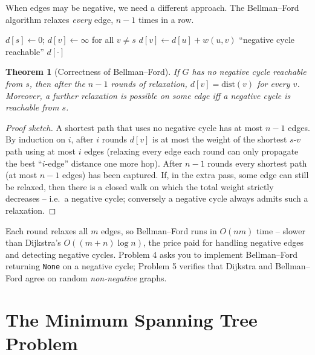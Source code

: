 \documentclass[11pt]{article}
\newtheorem{theorem}{Theorem}[section]
\begin{document}
When edges may be negative, we need a different approach. The Bellman--Ford
algorithm relaxes \emph{every} edge, $n-1$ times in a row.

\begin{algorithm}[h]
\caption{Bellman--Ford Single-Source Shortest Paths}
\begin{algorithmic}[1]
\State $d[s] \gets 0$; \quad $d[v] \gets \infty$ for all $v \ne s$
            \State $d[v] \gets d[u] + w(u,v)$ 
        \EndIf
    \EndFor
\EndFor
{} 
        \State \Return ``negative cycle reachable''
    \EndIf
\EndFor
\State \Return $d[\cdot]$
\end{algorithmic}
\end{algorithm}

\begin{theorem}[Correctness of Bellman--Ford]
If $G$ has no negative cycle reachable from $s$, then after the $n-1$ rounds of
relaxation, $d[v] = \mathrm{dist}(v)$ for every $v$. Moreover, a further
relaxation is possible on some edge \emph{iff} a negative cycle is reachable from
$s$.
\end{theorem}

\begin{proof}[Proof sketch]
A shortest path that uses no negative cycle has at most $n-1$ edges. By induction
on $i$, after $i$ rounds $d[v]$ is at most the weight of the shortest $s$-$v$
path using at most $i$ edges (relaxing every edge each round can only propagate
the best ``$i$-edge'' distance one more hop). After $n-1$ rounds every
shortest path (at most $n-1$ edges) has been captured. If, in the extra pass,
some edge can still be relaxed, then there is a closed walk on which the total
weight strictly decreases -- i.e.\ a negative cycle; conversely a negative cycle
always admits such a relaxation.
\end{proof}

Each round relaxes all $m$ edges, so Bellman--Ford runs in $O(nm)$ time --
slower than Dijkstra's $O((m+n)\log n)$, the price paid for handling negative
edges and detecting negative cycles. Problem 4 asks you to implement
Bellman--Ford returning \texttt{None} on a negative cycle; Problem 5 verifies
that Dijkstra and Bellman--Ford agree on random \emph{non-negative} graphs.

\section{The Minimum Spanning Tree Problem}
\end{document}
